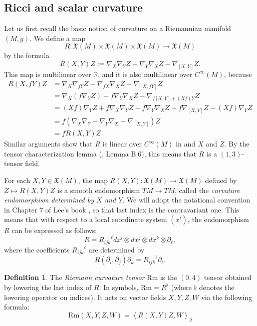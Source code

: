 \documentclass{amsart}
\numberwithin{equation}{section}
\def\frak#1{\mathfrak{#1}}
\newcommand{\del}{\partial}
\newcommand{\R}{\mathbb{R}}
\newcommand{\law}{\left\langle}
\newcommand{\raw}{\right\rangle}
\newcommand{\Rm}{\mathrm{Rm}}
\theoremstyle{plain}
\theoremstyle{definition}
\newtheorem{defn}[thm]{Definition}
\theoremstyle{remark}
\begin{document}
\subsection{Ricci and scalar curvature} 
Let us first recall the basic notion of curvature on a Riemannian manifold $(M,g)$. We define a map
\[R: \frak{X}(M) \times \frak{X}(M) \times \frak{X}(M) \to \frak{X}(M)\]
by the formula
\begin{equation}R(X,Y)Z := \nabla_X \nabla_Y Z - \nabla_Y \nabla_X Z - \nabla_{[X,Y]}Z.\end{equation}
This map is multilinear over $\R$, and it is also multilinear over $C^\infty(M)$, because
\begin{align*}
    R(X, fY)Z &= \nabla_X \nabla_{fY} Z - \nabla_{fX}\nabla_X Z - \nabla_{[X, fY]}Z \\ 
    &= \nabla_X(f\nabla_Y Z) - f \nabla_Y \nabla_X Z - \nabla_{f[X,Y] + (Xf)Y}Z\\
    &= (Xf)\nabla_Y Z + f \nabla_X \nabla_Y Z  - f \nabla_Y \nabla_X Z  - f\nabla_{[X,Y]}Z - (Xf)\nabla_Y Z\\
    &= f\left(\nabla_X \nabla_Y - \nabla_Y \nabla_X - \nabla_{[X,Y]}\right)Z\\
    &= fR(X,Y)Z
\end{align*}
Similar arguments show that $R$ is linear over $C^\infty(M)$ in and $X$ and $Z$. By the tensor characterization lemma (\cite{LeeRiemannian}, Lemma B.6), this means that $R$ is a $(1,3)$-tensor field.

For each $X, Y \in \frak{X}(M)$, the map $R(X,Y): \frak{X}(M) \to \frak{X}(M)$ defined by $Z \mapsto R(X,Y)Z$ is a smooth endomorphism $TM \to TM$, called the \emph{curvature endomorphism determined by $X$ and $Y$}. We will adopt the notational convention in Chapter 7 of Lee's book \cite{LeeRiemannian}, so that last index is the contravariant one. This means that with respect to a local coordinate system $(x^i)$, the endomorphism $R$ can be expressed as follows:
\[R = {R_{ijk}}^\ell dx^i \otimes dx^j \otimes dx^k \otimes \del_\ell,\]
where the coefficients ${R_{ijk}}^\ell$ are determined by
\[R(\del_i, \del_j)\del_k = {R_{ijk}}^\ell \del_\ell.\]
\begin{defn}
    The \emph{Riemann curvature tensor} $\Rm$ is the $(0, 4)$ tensor obtained by lowering the last index of $R$. In symbols, $\Rm = R^\flat$ (where $\flat$ denotes the lowering operator on indices). It acts on vector fields $X,Y,Z,W$ via the following formula:
    \[\Rm(X,Y,Z,W) = \law R(X, Y)Z, W \raw_g\]
\end{defn}
\end{document}
